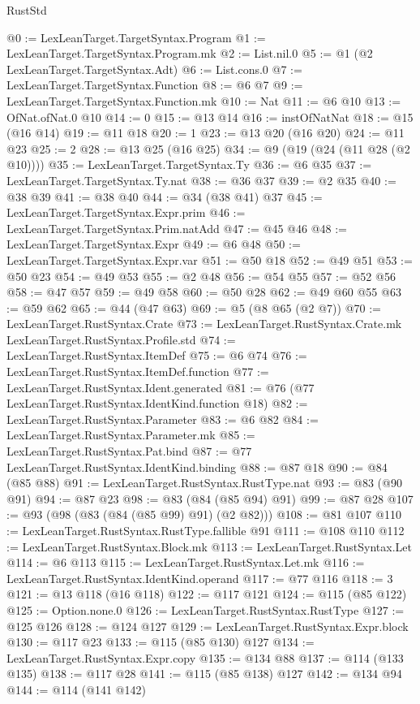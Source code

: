 \begin{lexlean}{RustStd}
\begin{coremodule}
@0 := LexLeanTarget.TargetSyntax.Program
@1 := LexLeanTarget.TargetSyntax.Program.mk
@2 := List.nil.{0}
@5 := @1 (@2 LexLeanTarget.TargetSyntax.Adt)
@6 := List.cons.{0}
@7 := LexLeanTarget.TargetSyntax.Function
@8 := @6 @7
@9 := LexLeanTarget.TargetSyntax.Function.mk
@10 := Nat
@11 := @6 @10
@13 := OfNat.ofNat.{0} @10
@14 := 0
@15 := @13 @14
@16 := instOfNatNat
@18 := @15 (@16 @14)
@19 := @11 @18
@20 := 1
@23 := @13 @20 (@16 @20)
@24 := @11 @23
@25 := 2
@28 := @13 @25 (@16 @25)
@34 := @9 (@19 (@24 (@11 @28 (@2 @10))))
@35 := LexLeanTarget.TargetSyntax.Ty
@36 := @6 @35
@37 := LexLeanTarget.TargetSyntax.Ty.nat
@38 := @36 @37
@39 := @2 @35
@40 := @38 @39
@41 := @38 @40
@44 := @34 (@38 @41) @37
@45 := LexLeanTarget.TargetSyntax.Expr.prim
@46 := LexLeanTarget.TargetSyntax.Prim.natAdd
@47 := @45 @46
@48 := LexLeanTarget.TargetSyntax.Expr
@49 := @6 @48
@50 := LexLeanTarget.TargetSyntax.Expr.var
@51 := @50 @18
@52 := @49 @51
@53 := @50 @23
@54 := @49 @53
@55 := @2 @48
@56 := @54 @55
@57 := @52 @56
@58 := @47 @57
@59 := @49 @58
@60 := @50 @28
@62 := @49 @60 @55
@63 := @59 @62
@65 := @44 (@47 @63)
@69 := @5 (@8 @65 (@2 @7))
@70 := LexLeanTarget.RustSyntax.Crate
@73 := LexLeanTarget.RustSyntax.Crate.mk LexLeanTarget.RustSyntax.Profile.std
@74 := LexLeanTarget.RustSyntax.ItemDef
@75 := @6 @74
@76 := LexLeanTarget.RustSyntax.ItemDef.function
@77 := LexLeanTarget.RustSyntax.Ident.generated
@81 := @76 (@77 LexLeanTarget.RustSyntax.IdentKind.function @18)
@82 := LexLeanTarget.RustSyntax.Parameter
@83 := @6 @82
@84 := LexLeanTarget.RustSyntax.Parameter.mk
@85 := LexLeanTarget.RustSyntax.Pat.bind
@87 := @77 LexLeanTarget.RustSyntax.IdentKind.binding
@88 := @87 @18
@90 := @84 (@85 @88)
@91 := LexLeanTarget.RustSyntax.RustType.nat
@93 := @83 (@90 @91)
@94 := @87 @23
@98 := @83 (@84 (@85 @94) @91)
@99 := @87 @28
@107 := @93 (@98 (@83 (@84 (@85 @99) @91) (@2 @82)))
@108 := @81 @107
@110 := LexLeanTarget.RustSyntax.RustType.fallible @91
@111 := @108 @110
@112 := LexLeanTarget.RustSyntax.Block.mk
@113 := LexLeanTarget.RustSyntax.Let
@114 := @6 @113
@115 := LexLeanTarget.RustSyntax.Let.mk
@116 := LexLeanTarget.RustSyntax.IdentKind.operand
@117 := @77 @116
@118 := 3
@121 := @13 @118 (@16 @118)
@122 := @117 @121
@124 := @115 (@85 @122)
@125 := Option.none.{0}
@126 := LexLeanTarget.RustSyntax.RustType
@127 := @125 @126
@128 := @124 @127
@129 := LexLeanTarget.RustSyntax.Expr.block
@130 := @117 @23
@133 := @115 (@85 @130) @127
@134 := LexLeanTarget.RustSyntax.Expr.copy
@135 := @134 @88
@137 := @114 (@133 @135)
@138 := @117 @28
@141 := @115 (@85 @138) @127
@142 := @134 @94
@144 := @114 (@141 @142)

\end{coremodule}
\end{lexlean}
